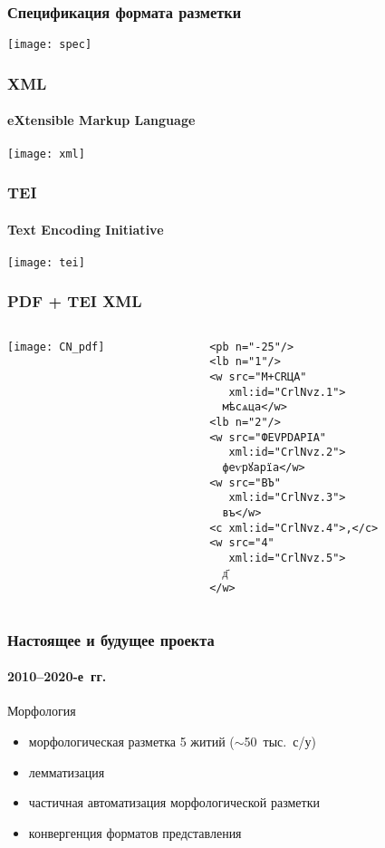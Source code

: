 \begin{frame}
  \frametitle{Спецификация формата разметки}

  \begin{center}
    \texttt{[image: spec]}
  \end{center}
\end{frame}

\begin{frame}
  \frametitle{XML}
  \framesubtitle{eXtensible Markup Language}

  \begin{center}
    \texttt{[image: xml]}
  \end{center}
\end{frame}

\begin{frame}
  \frametitle{TEI}
  \framesubtitle{Text Encoding Initiative}

  \begin{center}
    \texttt{[image: tei]}
  \end{center}
\end{frame}

\begin{frame}[fragile]
  \frametitle{PDF + TEI XML}

  \begin{columns}[c]
    \begin{column}{6cm}
      \texttt{[image: CN\_pdf]}
    \end{column}

    \begin{column}{6cm}
      \begin{Verbatim}[fontsize=\footnotesize]
<pb n="-25"/>
<lb n="1"/>
<w src="М+СRЦА"
   xml:id="CrlNvz.1">
  мѣсѧца</w>
<lb n="2"/>
<w src="ФЕVРDАРIА"
   xml:id="CrlNvz.2">
  феѵрꙋарїа</w>
<w src="ВЪ"
   xml:id="CrlNvz.3">
  въ</w>
<c xml:id="CrlNvz.4">,</c>
<w src="4"
   xml:id="CrlNvz.5">
  д҃
</w>
\end{Verbatim}
    \end{column}
  \end{columns}
\end{frame}

\begin{frame}
  \frametitle{Настоящее и будущее проекта}
  \framesubtitle{2010--2020-е~гг.}

  \begin{block}{Морфология}
    \begin{itemize}
      \item морфологическая разметка 5 житий ($\sim$50~тыс.\ с/у)
      \item лемматизация\autocite{sipunin:2018}
      \item частичная автоматизация морфологической разметки\autocite{sipunin:2020}
      \item конвергенция форматов представления
    \end{itemize}
  \end{block}
\end{frame}


